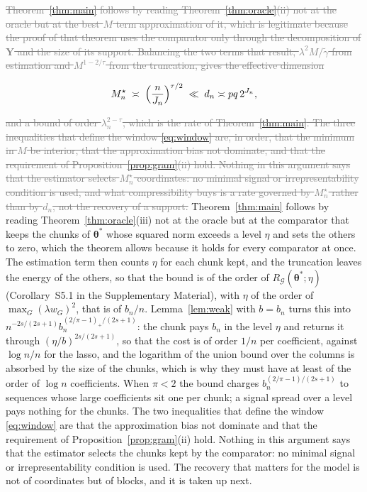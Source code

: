 \documentclass[12pt]{article} %
\theoremstyle{definition}
\theoremstyle{plain}
\newcommand{\btheta}{\boldsymbol{\theta}}
\newcommand{\thetastar}{\btheta^{*}}
\newcommand{\pen}{\lambda}
\newcommand{\penn}{\lambda_{n}}
\newcommand{\bY}{\mathbf{Y}}
\newcommand{\gtil}{\widetilde{\gamma}}
\newcommand{\Mstar}{M^{\star}}
\newcommand{\bn}{b_{n}}
\newcommand{\Rid}{R_{\mathcal{G}}}
\newcommand{\removedk}{\par\noindent[removed in k = 4]\par}
\begin{document}
\textcolor{gray}{\sout{Theorem~\mbox{\ref{thm:main}} follows by reading Theorem~\mbox{\ref{thm:oracle}}(ii) not at
the oracle but at the best $M$ term approximation of it, which is legitimate
because the proof of that theorem uses the comparator only through the
decomposition of $\bY$ and the size of its support. Balancing the two terms
that result, $\pen^{2}M/\gtil$ from estimation and
$M^{1-2/\tau}$ from the truncation, gives the effective dimension}}
{\color{gray}\removedk
\[
  \Mstar_n \;\asymp\; \Bigl(\frac{n}{J_n}\Bigr)^{\tau/2}
  \;\ll\; d_n \asymp pq\,2^{J_n},
\]
}
\textcolor{gray}{\sout{and a bound of order $\penn^{2-\tau}$, which is the rate of
Theorem~\mbox{\ref{thm:main}}. The three inequalities that define the window
\mbox{\eqref{eq:window}} are, in order, that the minimum in $M$ be interior, that the
approximation bias not dominate, and that the requirement of
Proposition~\mbox{\ref{prop:gram}}(ii) hold. Nothing in this argument says that the
estimator selects $\Mstar_n$ coordinates: no minimal signal or
irrepresentability condition is used, and what compressibility buys is a rate
governed by $\Mstar_n$ rather than by $d_n$, not the recovery of a support.}}
\textcolor{colR1}{Theorem~\ref{thm:main} follows by reading
Theorem~\ref{thm:oracle}(iii) not at the oracle but at the comparator that
keeps the chunks of $\thetastar$ whose squared norm exceeds a level $\eta$ and
sets the others to zero, which the theorem allows because it holds for every
comparator at once. The estimation term then counts $\eta$ for each chunk
kept, and the truncation leaves the energy of the others, so that the bound is
of the order of $\Rid(\thetastar;\eta)$ (Corollary~S5.1 in the Supplementary
Material), with $\eta$ of the order of $\max_{G}(\pen w_{G})^{2}$, that is of
$\bn/n$. Lemma~\ref{lem:weak} with $b = \bn$ turns this into
$n^{-2s/(2s+1)}\bn^{(2/\pi-1)_{+}/(2s+1)}$: the chunk pays $\bn$ in the level
$\eta$ and returns it through $(\eta/b)^{2s/(2s+1)}$, so that the cost is of
order $1/n$ per coefficient, against $\log n/n$ for the lasso, and the
logarithm of the union bound over the columns is absorbed by the size of the
chunks, which is why they must have at least of the order of $\log n$
coefficients. When $\pi < 2$ the bound charges
$\bn^{(2/\pi-1)/(2s+1)}$ to sequences whose large coefficients sit one per
chunk; a signal spread over a level pays nothing for the chunks. The two
inequalities that define the window \eqref{eq:window} are that the
approximation bias not dominate and that the requirement of
Proposition~\ref{prop:gram}(ii) hold. Nothing in this argument says that the
estimator selects the chunks kept by the comparator: no minimal signal or
irrepresentability condition is used.}
\textcolor{colR1}{The recovery that matters for the model is not of coordinates
but of blocks, and it is taken up next.}
\end{document}
